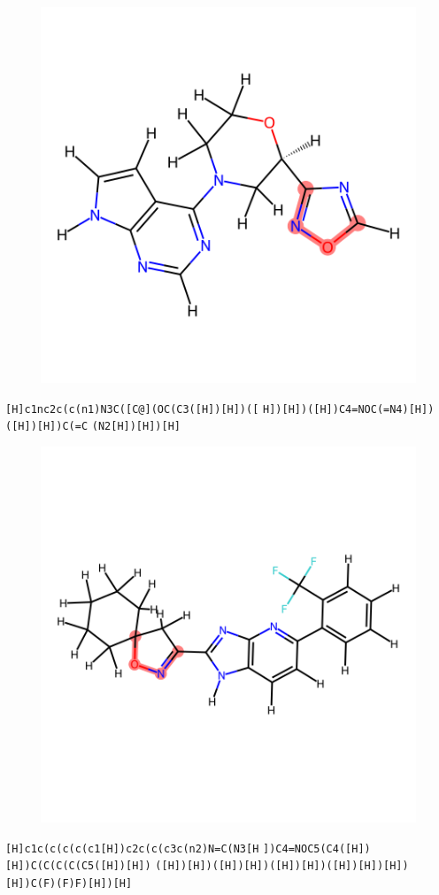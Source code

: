 \documentclass{article}
\begin{document}
\begin{figure}[ht]
\centering
    \includegraphics{mol54.png}
\end{figure}
\verb|[H]c1nc2c(c(n1)N3C([C@](OC(C3([H])[H])([| \verb|H])[H])([H])C4=NOC(=N4)[H])([H])[H])C(=C| \verb|(N2[H])[H])[H]|

\begin{figure}[ht]
\centering
    \includegraphics{mol55.png}
\end{figure}
\verb|[H]c1c(c(c(c(c1[H])c2c(c(c3c(n2)N=C(N3[H| \verb|])C4=NOC5(C4([H])[H])C(C(C(C(C5([H])[H])| \verb|([H])[H])([H])[H])([H])[H])([H])[H])[H])| \verb|[H])C(F)(F)F)[H])[H]|
\end{document}
